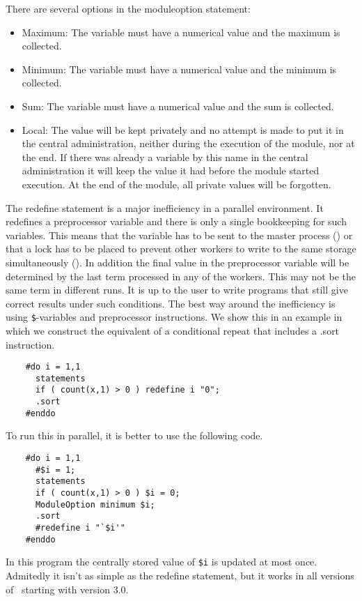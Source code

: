 There are several options in the moduleoption statement:
\begin{itemize}
\item Maximum: The variable must have a 
numerical value and the maximum is collected.
\item Minimum: The variable must have a 
numerical value and the minimum is collected.
\item Sum: The variable must have a numerical value 
and the sum is collected.
\item Local: The value will be kept privately and 
no attempt is made to put it in the central administration, neither during 
the execution of the module, nor at the end. If there was already a 
variable by this name in the central administration it will keep the value 
it had before the module started execution. At the end of the module, all 
private values will be forgotten.
\end{itemize}

The redefine statement is a major inefficiency in a parallel environment. 
It redefines a preprocessor variable and there is only a single bookkeeping 
for such variables. This means that the variable has to be sent to the 
master process (\ParFORM) or that a lock has to be placed to prevent other 
workers to write to the same storage simultaneously (\TFORM). In addition 
the final value in the preprocessor variable will be determined by the last 
term processed in any of the workers. This may not be the same term in 
different runs. It is up to the user to write programs that still give 
correct results under such conditions. The best way around the inefficiency 
is using \verb:$:-variables and preprocessor instructions. We show this in 
an example in which we construct the equivalent of a conditional repeat 
that includes a .sort instruction.
\begin{verbatim}
    #do i = 1,1
      statements
      if ( count(x,1) > 0 ) redefine i "0";
      .sort
    #enddo
\end{verbatim}
To run this in parallel, it is better to use the following code.
\begin{verbatim}
    #do i = 1,1
      #$i = 1;
      statements
      if ( count(x,1) > 0 ) $i = 0;
      ModuleOption minimum $i;
      .sort
      #redefine i "`$i'"
    #enddo
\end{verbatim}
In this program the centrally stored value of \verb:$i: is updated at most 
once. Admitedly it isn't as simple as the redefine statement, but it 
works in all versions of \FORM\ starting with version 3.0.

